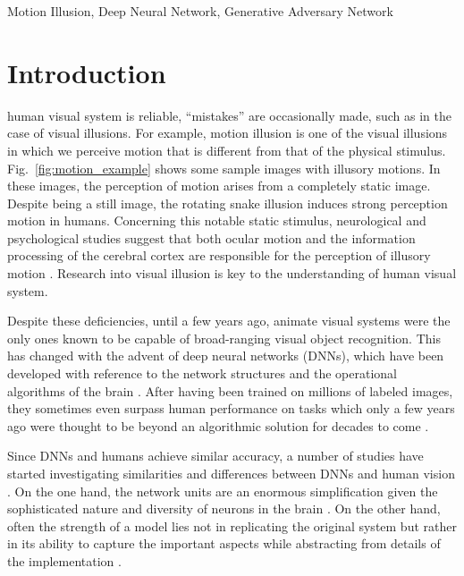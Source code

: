 \documentclass[journal]{IEEEtran}
\begin{document}
  \begin{IEEEkeywords}
  Motion Illusion, Deep Neural Network, Generative Adversary Network
  \end{IEEEkeywords}
  
  
  \IEEEpeerreviewmaketitle
  
  
  \section{Introduction}
  \label{sec:intro}
  
   human visual system is reliable, ``mistakes'' are occasionally made, such as in the case of visual illusions. For example, motion illusion is one of the visual illusions in which we perceive motion that is different from that of the physical stimulus. Fig.~\ref{fig:motion_example} shows some sample images with illusory motions. In these images, the perception of motion arises from a completely static image. Despite being a still image, the rotating snake illusion induces strong perception motion in humans. Concerning this notable static stimulus, neurological and psychological studies suggest that both ocular motion and the information processing of the cerebral cortex are responsible for the perception of illusory motion \cite{HISAKATA20081940}. Research into visual illusion is key to the understanding of human visual system.
  
  Despite these deficiencies, until a few years ago, animate visual systems were the only ones known to be capable of broad-ranging visual object recognition. This has changed with the advent of deep neural networks (DNNs), which have been developed with reference to the network structures and the operational algorithms of the brain \cite{geirhos2018generalisation}. After having been trained on millions of labeled images, they sometimes even surpass human performance on tasks which only a few years ago were thought to be beyond an algorithmic solution for decades to come \cite{he2015delving, silver2016mastering}.
  
  Since DNNs and humans achieve similar accuracy, a number of studies have started investigating similarities and differences between DNNs and human vision \cite{cadieu2014deep, yamins2014performance, cichy2017dynamics}. On the one hand, the network units are an enormous simplification given the sophisticated nature and diversity of neurons in the brain .  On the other hand, often the strength of a model lies not in replicating the original system but rather in its ability to capture the important aspects while abstracting from details of the implementation \cite{kriegeskorte2015deep}.
  
\end{document}

